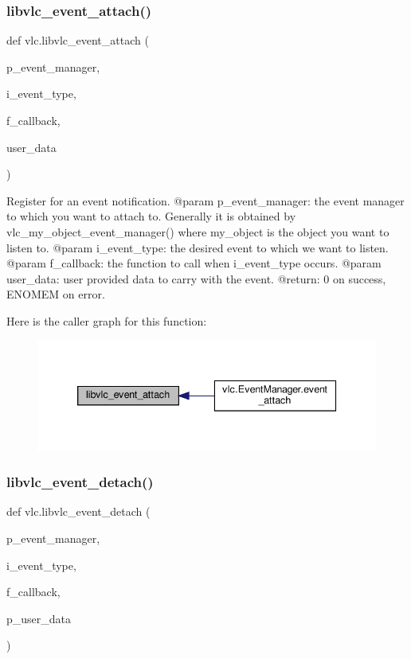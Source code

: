 \subsubsection{\texorpdfstring{libvlc\+\_\+event\+\_\+attach()}{libvlc\_event\_attach()}}
{\footnotesize\ttfamily def vlc.\+libvlc\+\_\+event\+\_\+attach (\begin{DoxyParamCaption}\item[{}]{p\+\_\+event\+\_\+manager,  }\item[{}]{i\+\_\+event\+\_\+type,  }\item[{}]{f\+\_\+callback,  }\item[{}]{user\+\_\+data }\end{DoxyParamCaption})}

\begin{DoxyVerb}Register for an event notification.
@param p_event_manager: the event manager to which you want to attach to. Generally it is obtained by vlc_my_object_event_manager() where my_object is the object you want to listen to.
@param i_event_type: the desired event to which we want to listen.
@param f_callback: the function to call when i_event_type occurs.
@param user_data: user provided data to carry with the event.
@return: 0 on success, ENOMEM on error.
\end{DoxyVerb}
 Here is the caller graph for this function\+:
\nopagebreak
\begin{figure}[H]
\begin{center}
\leavevmode
\includegraphics[width=339pt]{namespacevlc_a850485fc3bc6fa1c7a93adfd2ac93f2b_icgraph}
\end{center}
\end{figure}
\mbox{\label{namespacevlc_a67ba99f7479ae36483024ec3e8746380}} 
\subsubsection{\texorpdfstring{libvlc\+\_\+event\+\_\+detach()}{libvlc\_event\_detach()}}
{\footnotesize\ttfamily def vlc.\+libvlc\+\_\+event\+\_\+detach (\begin{DoxyParamCaption}\item[{}]{p\+\_\+event\+\_\+manager,  }\item[{}]{i\+\_\+event\+\_\+type,  }\item[{}]{f\+\_\+callback,  }\item[{}]{p\+\_\+user\+\_\+data }\end{DoxyParamCaption})}

